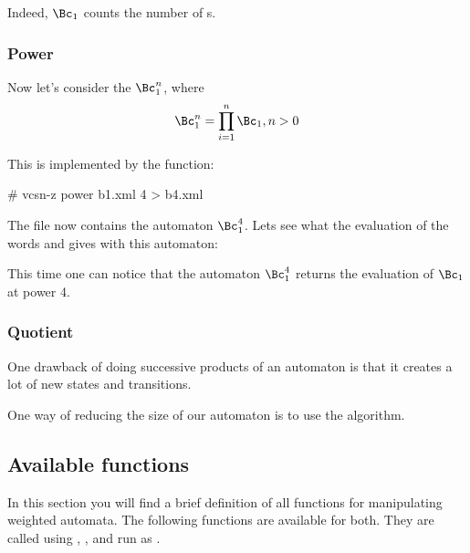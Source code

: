 
\noindent
Indeed, $\Bc_1$ counts the number of s.

\subsubsection{Power}

Now let's consider the $\Bc_1^n$, where
\begin{displaymath}
  \Bc_1^n = \prod_{i=1}^n \Bc_1, n > 0
\end{displaymath}

\noindent
This is implemented by the  function:

\begin{shell}
# vcsn-z power b1.xml 4 > b4.xml
\end{shell}

\noindent
The file  now contains the automaton $\Bc_1^4$.
Lets see what the evaluation of the words  and 
gives with this automaton:


This time one can notice that the automaton $\Bc_1^4$ returns
the evaluation of $\Bc_1$ at power 4.

\subsubsection{Quotient}

One drawback of doing successive products of an automaton is
that it creates a lot of new states and transitions.


One way of reducing the size of our automaton is to use the
 algorithm.


\subsection{Available functions}

In this section you will find a brief definition of all functions for
manipulating weighted automata. The following functions are available
for both.  They are called using ,
, and  run as
.

